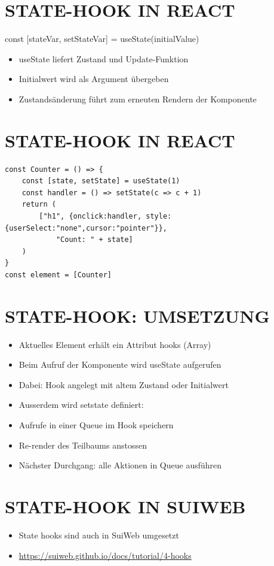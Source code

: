 \section*{STATE-HOOK IN REACT}
const [stateVar, setStateVar] = useState(initialValue)

\begin{itemize}
  \item useState liefert Zustand und Update-Funktion
  \item Initialwert wird als Argument übergeben
  \item Zustandsänderung führt zum erneuten Rendern der Komponente
\end{itemize}

\section*{STATE-HOOK IN REACT}
\begin{verbatim}
const Counter = () => {
    const [state, setState] = useState(1)
    const handler = () => setState(c => c + 1)
    return (
        ["h1", {onclick:handler, style:{userSelect:"none",cursor:"pointer"}},
            "Count: " + state]
    )
}
const element = [Counter]
\end{verbatim}

\section*{STATE-HOOK: UMSETZUNG}
\begin{itemize}
  \item Aktuelles Element erhält ein Attribut hooks (Array)
  \item Beim Aufruf der Komponente wird useState aufgerufen
  \item Dabei: Hook angelegt mit altem Zustand oder Initialwert
  \item Ausserdem wird setstate definiert:
  \item Aufrufe in einer Queue im Hook speichern
  \item Re-render des Teilbaums anstossen
  \item Nächster Durchgang: alle Aktionen in Queue ausführen
\end{itemize}

\section*{STATE-HOOK IN SUIWEB}
\begin{itemize}
  \item State hooks sind auch in SuiWeb umgesetzt
  \item \href{https://suiweb.github.io/docs/tutorial/4-hooks}{https://suiweb.github.io/docs/tutorial/4-hooks}
\end{itemize}

